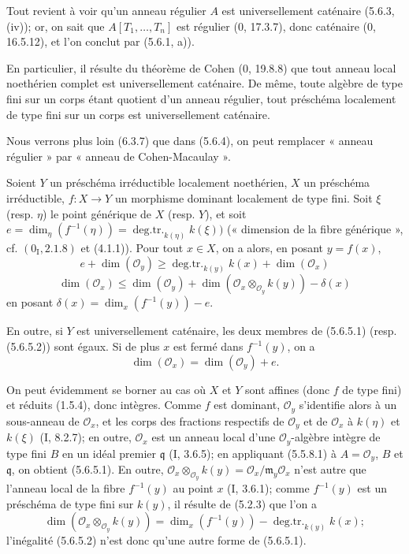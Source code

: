 Tout revient à voir qu'un anneau régulier $A$ est universellement caténaire
(5.6.3, (iv)); or, on sait que $A[T_1,\ldots,T_n]$ est régulier (0, 17.3.7),
donc caténaire (0, 16.5.12), et l'on conclut par (5.6.1, a)).

En particulier, il résulte du théorème de Cohen (0, 19.8.8) que tout anneau
local noethérien complet est universellement caténaire. De même, toute
algèbre de type fini sur un corps étant quotient d'un anneau régulier, tout
préschéma localement de type fini sur un corps est universellement caténaire.

Nous verrons plus loin (6.3.7) que dans (5.6.4), on peut remplacer « anneau
régulier » par « anneau de Cohen-Macaulay ».

\begin{proposition}[5.6.5]
\label{IV.2.s5.6.5-fr}
Soient $Y$ un préschéma irréductible localement noethérien, $X$ un préschéma
irréductible, $f:X\to Y$ un morphisme dominant localement de type fini. Soit
$\xi$ (resp. $\eta$) le point générique de $X$ (resp. $Y$), et soit
$e=\dim_\eta(f^{-1}(\eta))=\operatorname{deg.tr.}_{k(\eta)}k(\xi))$
(« dimension de la fibre générique », cf. $(0_{\mathrm I},2.1.8)$ et
(4.1.1)). Pour tout $x\in X$, on a alors, en posant $y=f(x)$,
\begin{equation}
e+\dim(\mathcal O_y)
\geq\operatorname{deg.tr.}_{k(y)}k(x)+\dim(\mathcal O_x)
\tag{5.6.5.1}\label{IV.2.s5.6.5.1-fr}
\end{equation}
\begin{equation}
\dim(\mathcal O_x)
\leq\dim(\mathcal O_y)
+\dim(\mathcal O_x\otimes_{\mathcal O_y}k(y))-\delta(x)
\tag{5.6.5.2}\label{IV.2.s5.6.5.2-fr}
\end{equation}
en posant $\delta(x)=\dim_x(f^{-1}(y))-e$.

En outre, si $Y$ est universellement caténaire, les deux membres de
(5.6.5.1) (resp. (5.6.5.2)) sont égaux. Si de plus $x$ est fermé dans
$f^{-1}(y)$, on a
\begin{equation}
\dim(\mathcal O_x)=\dim(\mathcal O_y)+e.
\tag{5.6.5.3}\label{IV.2.s5.6.5.3-fr}
\end{equation}
\end{proposition}

On peut évidemment se borner au cas où $X$ et $Y$ sont affines (donc $f$ de
type fini) et réduits (1.5.4), donc intègres. Comme $f$ est dominant,
$\mathcal O_y$ s'identifie alors à un sous-anneau de $\mathcal O_x$, et les
corps des fractions respectifs de $\mathcal O_y$ et de $\mathcal O_x$ à
$k(\eta)$ et $k(\xi)$ (I, 8.2.7); en outre, $\mathcal O_x$ est un anneau
local d'une $\mathcal O_y$-algèbre intègre de type fini $B$ en un idéal
premier $\mathfrak q$ (I, 3.6.5); en appliquant (5.5.8.1) à
$A=\mathcal O_y$, $B$ et $\mathfrak q$, on obtient (5.6.5.1). En outre,
$\mathcal O_x\otimes_{\mathcal O_y}k(y)=\mathcal O_x/\mathfrak m_y\mathcal O_x$
n'est autre que l'anneau local de la fibre $f^{-1}(y)$ au point $x$
(I, 3.6.1); comme $f^{-1}(y)$ est un préschéma de type fini sur $k(y)$, il
résulte de (5.2.3) que l'on a
\[
\dim(\mathcal O_x\otimes_{\mathcal O_y}k(y))
=\dim_x(f^{-1}(y))-\operatorname{deg.tr.}_{k(y)}k(x);
\]
l'inégalité (5.6.5.2) n'est donc qu'une autre forme de (5.6.5.1).

